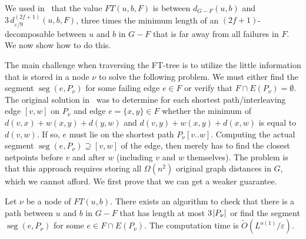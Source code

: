\documentclass{theoretics}
\DeclareMathOperator{\seg}{seg}
\newcommand*{\Otilde}{\widetilde{O}}
\newcommand*{\length}[1]{|#1|}
\newcommand*{\nwspace}{\hspace*{.1em}}
\newcommand{\eps}{\varepsilon}
\begin{document}
We used in~ that the value $FT(u,b,F)$
is between $d_{G-F}(u,b)$ and $3 \, d^{(2f+1)}_{\eps/9}(u,b,F)$,
three times the minimum length of an $(2f{+}1)$-decomposable between $u$ and $b$ in $G{-}F$
that is far away from all failures in $F$.
We now show how to do this.

The main challenge when traversing the FT-tree is to utilize the little information that is stored
in a node $\nu$ to solve the following problem.
We must either find the segment $\seg(e,P_{\nu})$ for some failing edge $e \in F$
or verify that $F \cap E(P_{\nu}) = \emptyset$.
The original solution in~\cite{ChCoFiKa17} was to determine for each 
shortest path/interleaving edge $[v,w]$ on $P_{\nu}$ and edge $e = \{x,y\} \in F$
whether the minimum of $d(v,x) + w(x,y) + d(y,w)$ and $d(v,y) + w(x,y) + d(x,w)$
is equal to $d(v,w)$.
If so, $e$ must lie on the shortest path $P_{\nu}[v..w]$.
Computing the actual segment $\seg(e,P_{\nu}) \supseteq [v,w]$ of the edge,
then merely has to find the closest netpoints before $v$ and after $w$
(including $v$ and $w$ themselves).
The problem is that this approach requires storing all $\Omega(n^2)$ original graph distances in $G$,
which we cannot afford.
We first prove that we can get a weaker guarantee.

\begin{lemma}
\label{lem:weaker_guarantee}
  Let $\nu$ be a node of $FT(u,b)$.
  There exists an algorithm to check that
  there is a path between $u$ and $b$ in $G{-}F$
  that has length at most $3 \nwspace \length{P_{\nu}}$ 
  or find the segment $\seg(e,P_{\nu})$ 
  for some $e \in F \cap E(P_{\nu})$.
  The computation time is $\Otilde(L^{o(1)}/{\eps})$.
\end{lemma}
\end{document}
